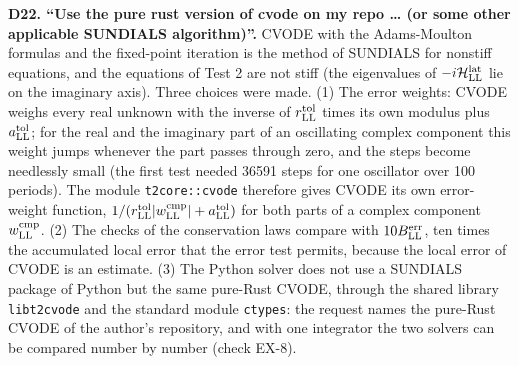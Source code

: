 \documentclass[
  10pt,
]{article}
\begin{document}
\textbf{D22. ``Use the pure rust version of cvode on my repo \ldots{}
(or some other applicable SUNDIALS algorithm)''.} CVODE with the
Adams-Moulton formulas and the fixed-point iteration is the method of
SUNDIALS for nonstiff equations, and the equations of Test 2 are not
stiff (the eigenvalues of \(-i\mathcal H^{\rm lat}_{\rm LL}\) lie on the
imaginary axis). Three choices were made. (1) The error weights: CVODE
weighs every real unknown with the inverse of \(r^{\rm tol}_{\rm LL}\)
times its own modulus plus \(a^{\rm tol}_{\rm LL}\); for the real and
the imaginary part of an oscillating complex component this weight jumps
whenever the part passes through zero, and the steps become needlessly
small (the first test needed 36591 steps for one oscillator over 100
periods). The module \texttt{t2core::cvode} therefore gives CVODE its
own error-weight function,
\(1/(r^{\rm tol}_{\rm LL}\lvert w^{\rm cmp}_{\rm LL}\rvert+a^{\rm tol}_{\rm LL})\)
for both parts of a complex component \(w^{\rm cmp}_{\rm LL}\). (2) The
checks of the conservation laws compare with \(10B^{\rm err}_{\rm LL}\),
ten times the accumulated local error that the error test permits,
because the local error of CVODE is an estimate. (3) The Python solver
does not use a SUNDIALS package of Python but the same pure-Rust CVODE,
through the shared library \texttt{libt2cvode} and the standard module
\texttt{ctypes}: the request names the pure-Rust CVODE of the author's
repository, and with one integrator the two solvers can be compared
number by number (check EX-8).
\end{document}
